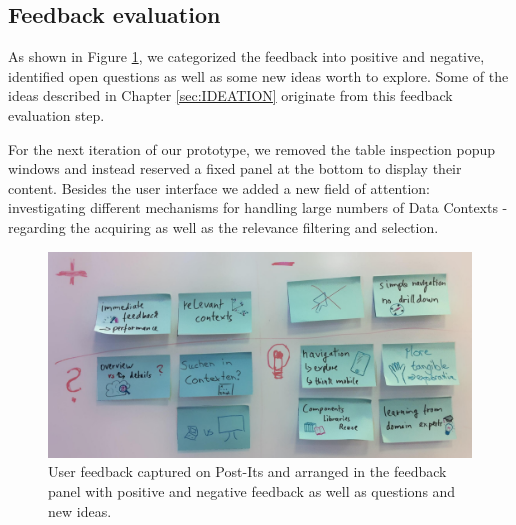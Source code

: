 \subsection{Feedback evaluation}
\label{subsec:FeedbackEvaluation}
As shown in Figure \ref{fig:user_feedback}, we categorized the feedback into positive and negative, identified open questions as well as some new ideas worth to explore. Some of the ideas described in Chapter \ref{sec:IDEATION} originate from this feedback evaluation step.

For the next iteration of our prototype, we removed the table inspection popup windows and instead reserved a fixed panel at the bottom to display their content. Besides the user interface we added a new field of attention: investigating different mechanisms for handling large numbers of Data Contexts - regarding the acquiring as well as the relevance filtering and selection.

\begin{figure}
\begin{centering}
    \includegraphics[width=1.0\linewidth]{images/user_feedback}
    \caption{User feedback captured on Post-Its and arranged in the feedback panel with positive and negative feedback as well as questions and new ideas.}
    \label{fig:user_feedback}
\end{centering}
\end{figure}